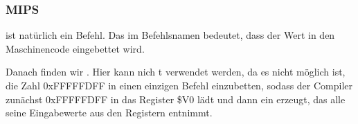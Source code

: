\subsubsection{MIPS}




 ist natürlich ein  Befehl. Das  im Befehlsnamen bedeutet,
dass der Wert in den Maschinencode eingebettet wird.

Danach finden wir \AND. Hier kann nich t verwendet werden, da es nicht
möglich ist, die Zahl 0xFFFFFDFF in einen einzigen Befehl einzubetten, sodass
der Compiler zunächst 0xFFFFFDFF in das Register \$V0 lädt und dann ein \AND
erzeugt, das alle seine Eingabewerte aus den Registern entnimmt.
